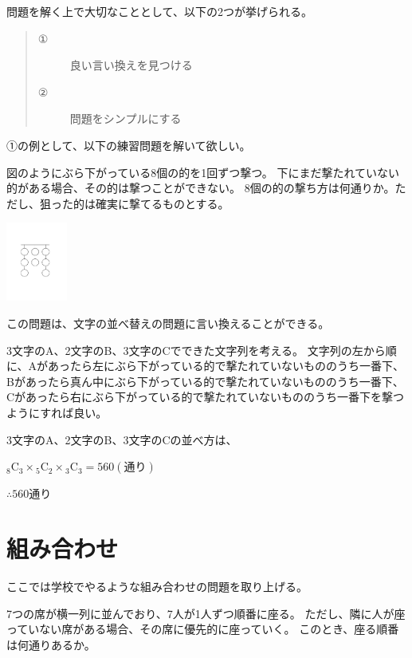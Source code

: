 \documentclass[uplatex,dvipdfmx]{jsbook}
\begin{document}
問題を解く上で大切なこととして、以下の2つが挙げられる。
\begin{quote}
    \begin{description}
        \item[①]良い言い換えを見つける
        \item[②]問題をシンプルにする
    \end{description}
\end{quote}

①の例として、以下の練習問題を解いて欲しい。

\begin{problem}[練習問題]
    図のようにぶら下がっている8個の的を1回ずつ撃つ。
    下にまだ撃たれていない的がある場合、その的は撃つことができない。
    8個の的の撃ち方は何通りか。ただし、狙った的は確実に撃てるものとする。

    \includegraphics[clip,width=2cm]{figures/c_practice1.pdf}
\end{problem}

\begin{answer}
    この問題は、文字の並べ替えの問題に言い換えることができる。

    3文字のA、2文字のB、3文字のCでできた文字列を考える。
    文字列の左から順に、Aがあったら左にぶら下がっている的で撃たれていないもののうち一番下、Bがあったら真ん中にぶら下がっている的で撃たれていないもののうち一番下、Cがあったら右にぶら下がっている的で撃たれていないもののうち一番下を撃つようにすれば良い。

    3文字のA、2文字のB、3文字のCの並べ方は、

    ${}_8\mathrm{C}_3 \times {}_5\mathrm{C}_2 \times {}_3\mathrm{C}_3
    =560(\text{通り})$

    $\therefore 560$通り
\end{answer}

\section{組み合わせ}
ここでは学校でやるような組み合わせの問題を取り上げる。
\begin{problem}[練習問題1]
    7つの席が横一列に並んでおり、7人が1人ずつ順番に座る。
    ただし、隣に人が座っていない席がある場合、その席に優先的に座っていく。
    このとき、座る順番は何通りあるか。
\end{problem}
\end{document}
